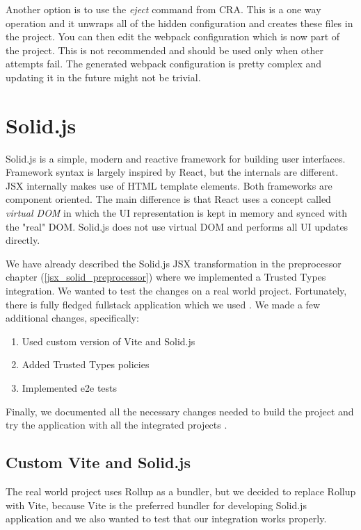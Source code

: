 Another option is to use the \textit{eject} command from CRA. This is a one way operation and it
unwraps all of the hidden configuration and creates these files in the project. You can then edit
the webpack configuration which is now part of the project. This is not recommended and should be
used only when other attempts fail. The generated webpack configuration is pretty complex and
updating it in the future might not be trivial.

\section{Solid.js}
\label{section:solid}

Solid.js is a simple, modern and reactive framework for building user interfaces. Framework
syntax is largely inspired by React, but the internals are different. JSX internally makes use of
HTML template elements. Both frameworks are component oriented. The main difference is that React
uses a concept called \emph{virtual DOM} in which the UI representation is kept in memory and synced
with the "real" DOM. Solid.js does not use virtual DOM and performs all UI updates directly.

We have already described the Solid.js JSX transformation in the preprocessor chapter
(\ref{jsx_solid_preprocessor}) where we implemented a Trusted Types integration. We wanted to test
the changes on a real world project. Fortunately, there is fully fledged fullstack application which
we used \cite{original_solid_realworld_project}. We made a few additional changes, specifically:

\begin{enumerate}
  \item Used custom version of Vite and Solid.js
  \item Added Trusted Types policies
  \item Implemented e2e tests
\end{enumerate}

Finally, we documented all the necessary changes needed to build the project and try the application
with all the integrated projects \cite{solid_realworld_project:readme}.

\subsection{Custom Vite and Solid.js}

The real world project uses Rollup as a bundler, but we decided to replace Rollup with Vite,
because Vite is the preferred bundler for developing Solid.js application and we also wanted to test
that our integration works properly.

